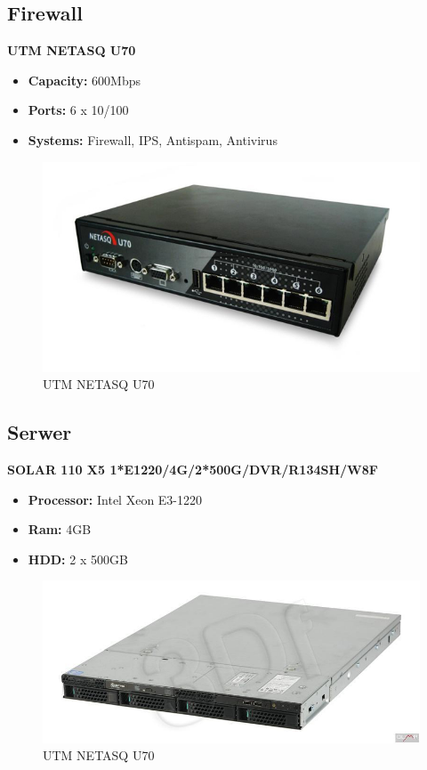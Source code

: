 \subsection{Firewall}
\textbf{UTM NETASQ U70}
\begin{itemize}
	\item \textbf{Capacity:} 600Mbps
	\item \textbf{Ports:} 6 x 10/100
	\item \textbf{Systems:} Firewall, IPS, Antispam, Antivirus  
\end{itemize}
 \begin{figure}[htbp]
	\begin{center}
        \includegraphics[scale = 0.5]{img/firewall.jpg}
        \caption{UTM NETASQ U70}
    \end{center}
\end{figure}

\newpage
\subsection{Serwer}
\textbf{SOLAR 110 X5 1*E1220/4G/2*500G/DVR/R134SH/W8F}
\begin{itemize}
	\item \textbf{Processor:} Intel Xeon E3-1220
	\item \textbf{Ram: } 4GB
	\item \textbf{HDD: } 2 x 500GB
\end{itemize}

 \begin{figure}[htbp]
	\begin{center}
        \includegraphics[scale = 0.5]{img/serwer.jpg}
        \caption{UTM NETASQ U70}
    \end{center}
\end{figure}